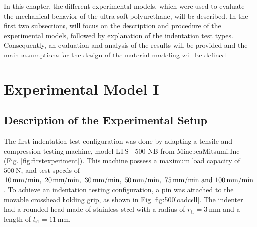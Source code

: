 In this chapter, the different experimental models, which were used to evaluate the 
mechanical behavior of the ultra-soft polyurethane, will be 
described. In the first two subsections, will focus on the description and 
procedure of the experimental models, followed by explanation of the indentation test 
types. Consequently, an evaluation and analysis of the results will be provided and the 
main assumptions for the design of the material modeling will be defined. 
\\ 


\section{Experimental Model I}
\label{section:expmod1}
    
\subsection*{Description of the Experimental Setup}

The first indentation test configuration was done by adapting a tensile and compression 
testing machine, model LTS - 500 NB from MinebeaMitsumi.Inc (Fig. \ref{fig:firstexperiment}). This 
machine possess a maximum load capacity of $\SI{500}{\newton}$, and test speeds of
$\SIlist[per-mode = symbol]{10;20;30;50;75;100}{\milli \metre \per \minute}$. To achieve an 
indentation testing configuration, a pin was attached to the movable crosshead holding grip, 
as shown in Fig \ref{fig:500loadcell}.
The indenter had a rounded head made of stainless steel with a
radius of $r_{i1} = \SI{3}{\milli \m}$ and a length of $l_{i1} = \SI{11}{\milli \m}$.

